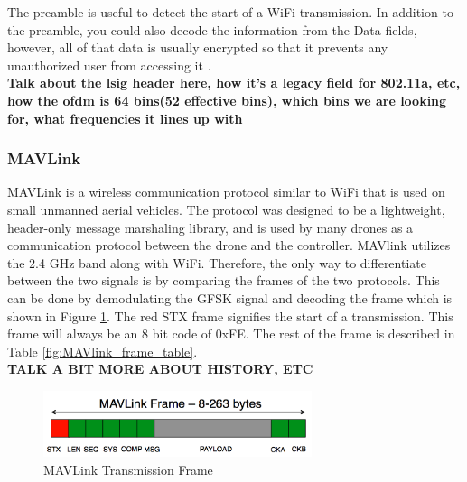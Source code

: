 The preamble is useful to detect the start of a WiFi transmission. In addition to the preamble, you could also decode the information from the Data fields, however, all of that data is usually encrypted so that it prevents any unauthorized user from accessing it \cite{wifi_book}.
\\ \textbf{Talk about the lsig header here, how it's a legacy field for 802.11a, etc, how the ofdm is 64 bins(52 effective bins), which bins we are looking for, what frequencies it lines up with}

\subsubsection{MAVLink}
MAVLink is a wireless communication protocol similar to WiFi that is used on small unmanned aerial vehicles. The protocol was designed to be a lightweight, header-only message marshaling library, and is used by many drones as a communication protocol between the drone and the controller. MAVlink utilizes the 2.4 GHz band along with WiFi. Therefore, the only way to differentiate between the two signals is by comparing the frames of the two protocols. This can be done by demodulating the GFSK signal and decoding the frame which is shown in Figure \ref{fig:MAVlink_frame}. The red STX frame signifies the start of a transmission. This frame will always be an 8 bit code of 0xFE. The rest of the frame is described in Table \ref{fig:MAVlink_frame_table}.
\\ \textbf{TALK A BIT MORE ABOUT HISTORY, ETC} 
\begin{figure}[ht]
\centering
\includegraphics[width=0.70\textwidth]{img/mavlink-packet.png}
\caption{MAVLink Transmission Frame}
\label{fig:MAVlink_frame}
\end{figure}
